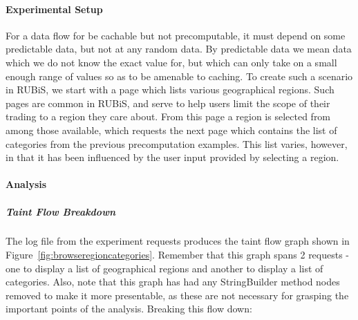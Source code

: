 \documentclass[msc,oneside]{ubcthesis}
\begin{document}
\paragraph{Experimental Setup}
For a data flow for be cachable but not precomputable, it must depend on some predictable data, but not at any random data. By predictable data we mean data which we do not know the exact value for, but which can only take on a small enough range of values so as to be amenable to caching. To create such a scenario in RUBiS, we start with a page which lists various geographical regions. Such pages are common in RUBiS, and serve to help users limit the scope of their trading to a region they care about. From this page a region is selected from among those available, which requests the next page which contains the list of categories from the previous precomputation examples. This list varies, however, in that it has been influenced by the user input provided by selecting a region.

\paragraph{Analysis}
\subparagraph{Taint Flow Breakdown}
The log file from the experiment requests produces the taint flow graph shown in Figure~\ref{fig:browseregioncategories}. Remember that this graph spans 2 requests - one to display a list of geographical regions and another to display a list of categories. Also, note that this graph has had any StringBuilder method nodes removed to make it more presentable, as these are not necessary for grasping the important points of the analysis. Breaking this flow down:
\end{document}

